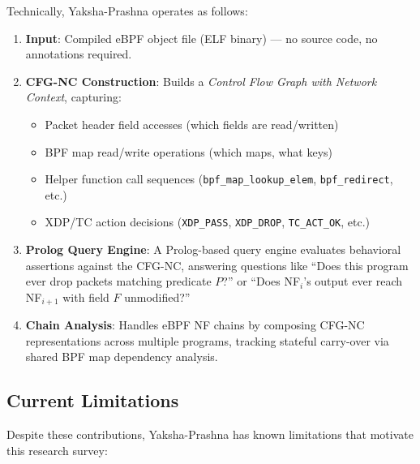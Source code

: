 \documentclass[12pt, a4paper]{article}
\begin{document}
Technically, Yaksha-Prashna operates as follows:
\begin{enumerate}
  \item \textbf{Input}: Compiled eBPF object file (ELF binary) — no source code, no annotations required.
  \item \textbf{CFG-NC Construction}: Builds a \emph{Control Flow Graph with Network Context}, capturing:
    \begin{itemize}
      \item Packet header field accesses (which fields are read/written)
      \item BPF map read/write operations (which maps, what keys)
      \item Helper function call sequences (\texttt{bpf\_map\_lookup\_elem}, \texttt{bpf\_redirect}, etc.)
      \item XDP/TC action decisions (\texttt{XDP\_PASS}, \texttt{XDP\_DROP}, \texttt{TC\_ACT\_OK}, etc.)
    \end{itemize}
  \item \textbf{Prolog Query Engine}: A Prolog-based query engine evaluates behavioral assertions against the CFG-NC, answering questions like ``Does this program ever drop packets matching predicate $P$?'' or ``Does NF$_i$'s output ever reach NF$_{i+1}$ with field $F$ unmodified?''
  \item \textbf{Chain Analysis}: Handles eBPF NF chains by composing CFG-NC representations across multiple programs, tracking stateful carry-over via shared BPF map dependency analysis.
\end{enumerate}

\subsection{Current Limitations}

Despite these contributions, Yaksha-Prashna has known limitations that motivate this research survey:
\end{document}

